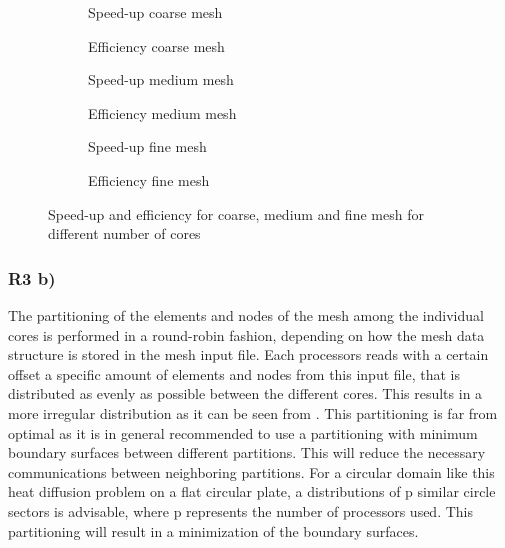 \begin{figure}[h!]
	\centering
	\begin{subfigure}{0.49\textwidth}
		\centering
		\resizebox{0.5\width}{!}{}
		\caption{\label{fig::SPcoarseMPI} Speed-up coarse mesh}
	\end{subfigure}
	\hfill
	\begin{subfigure}{0.49\textwidth}
		\centering
		\resizebox{0.5\width}{!}{}
		\caption{\label{fig::EffcoarseMPI} Efficiency coarse mesh}
	\end{subfigure}
	\hfill
	\begin{subfigure}{0.49\textwidth}
		\centering
		\resizebox{0.5\width}{!}{}
		\caption{\label{fig::SPmediumMPI} Speed-up medium mesh}
	\end{subfigure}
	\hfill
	\begin{subfigure}{0.49\textwidth}
		\centering
		\resizebox{0.5\width}{!}{}
		\caption{\label{fig::EffmediumMPI} Efficiency medium mesh}
	\end{subfigure}
	\hfill
	\begin{subfigure}{0.49\textwidth}
		\centering
		\resizebox{0.5\width}{!}{}
		\caption{\label{fig::SPfineMPI} Speed-up fine mesh}
	\end{subfigure}
	\hfill
	\begin{subfigure}{0.49\textwidth}
		\centering
		\resizebox{0.5\width}{!}{}
		\caption{\label{fig::EfffineMPI} Efficiency fine mesh}
	\end{subfigure}
	\caption{\label{fig::MPI} Speed-up and efficiency for coarse, medium and fine mesh for different number of cores}
\end{figure}
\clearpage

\subsubsection{R3 b) \label{sec:partitioning}}

The partitioning of the elements and nodes of the mesh among the individual cores is performed in a round-robin fashion, depending on how the mesh data structure is stored in the mesh input file. Each processors reads with a certain offset a specific amount of elements and nodes from this input file, that is distributed as evenly as possible between the different cores. This results in a more irregular distribution as it can be seen from . This partitioning is far from optimal as it is in general recommended to use a partitioning with minimum boundary surfaces between different partitions. This will reduce the necessary communications between neighboring partitions. For a circular domain like this heat diffusion problem on a flat circular plate, a distributions of p similar circle sectors is advisable, where p represents the number of processors used. This partitioning will result in a minimization of the boundary surfaces.

